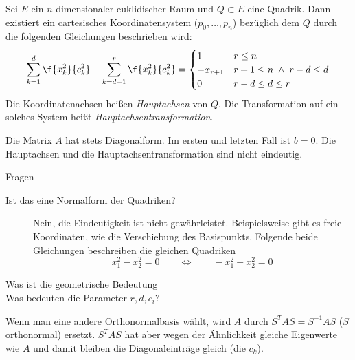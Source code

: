 \documentclass[a4paper, 10pt]{scrbook}
\begin{document}
\begin{thm}
	\label{thm:14.3}
	Sei $E$ ein $n$-dimensionaler euklidischer Raum und $Q\subset E$ eine Quadrik.
	Dann existiert ein cartesisches Koordinatensystem ($p_0,\dotsc, p_n$) bezüglich dem $Q$ durch die folgenden Gleichungen beschrieben wird:
	\begin{align*}
	\sum_{k=1}^d\f{x_k^2}{c_k^2} - \sum_{k=d+1}^r \f{x_{k}^2}{c_k^2} = \begin{cases}
		1 & r \le n\\
		-x_{r+1} & r+1 \le n \;\land\; r-d \le d\\
		0 & r-d \le d \le r
	\end{cases}
	\end{align*}
	Die Koordinatenachsen heißen \emph{Hauptachsen} von $Q$.
	Die Transformation auf ein solches System heißt \emph{Hauptachsentransformation}.
	\begin{note}
		Die Matrix $A$ hat stets Diagonalform.
		Im ersten und letzten Fall ist $b=0$. 
		Die Hauptachsen und die Hauptachsentransformation sind nicht eindeutig.
	\end{note}
\end{thm}

\begin{seg}{Fragen}
	\begin{description}
		\item[Ist das eine Normalform der Quadriken?]
			Nein, die Eindeutigkeit ist nicht gewährleistet.
			Beispielsweise gibt es freie Koordinaten, wie die Verschiebung des Basispunkts.
			Folgende beide Gleichungen beschreiben die gleichen Quadriken
			\[
				x_1^2 - x_2^2 = 0 \qquad \iff  \qquad -x_1^2 + x_2^2 = 0
			\]
		\item[Was ist die geometrische Bedeutung]

		\item[Was bedeuten die Parameter $r,d,c_i$?]
	\end{description}
\end{seg}

Wenn man eine andere Orthonormalbasis wählt, wird $A$ durch $S^TAS = S^{-1}AS$ ($S$ orthonormal) ersetzt.
$S^TAS$ hat aber wegen der Ähnlichkeit gleiche Eigenwerte wie $A$ und damit bleiben die Diagonaleinträge gleich (die $c_k$).
\end{document}
